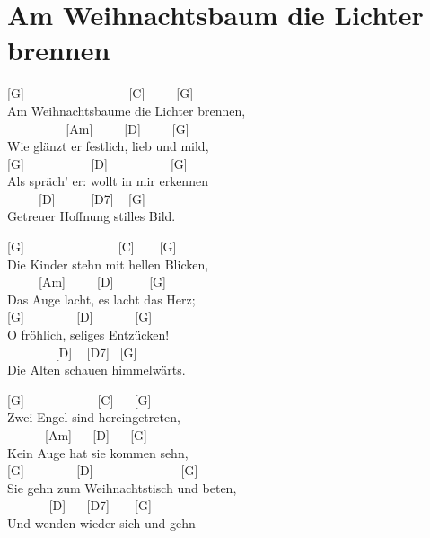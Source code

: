 \documentclass[
  letterpaper,
]{scrbook}
\begin{document}
\hypertarget{am-weihnachtsbaum-die-lichter-brennen}{%
\chapter{Am Weihnachtsbaum die Lichter
brennen}\label{am-weihnachtsbaum-die-lichter-brennen}}

{[}G{]} ~ ~ ~ ~ ~ ~ ~ ~ ~ ~{[}C{]} ~ ~ ~{[}G{]}\\
Am Weihnachtsbaume die Lichter brennen,\\
\hspace*{0.333em} ~ ~ ~ ~ ~ ~{[}Am{]} ~ ~ ~{[}D{]} ~ ~ ~{[}G{]}\\
Wie glänzt er festlich, lieb und mild,\\
{[}G{]} ~ ~ ~ ~ ~ ~ {[}D{]} ~ ~ ~ ~ ~ ~{[}G{]}\\
Als spräch' er: wollt in mir erkennen\\
\hspace*{0.333em} ~ ~ ~ {[}D{]} ~ ~ ~ {[}D7{]} ~ {[}G{]}\\
Getreuer Hoffnung stilles Bild.

{[}G{]} ~ ~ ~ ~ ~ ~ ~ ~ ~{[}C{]} ~ ~ {[}G{]}\\
Die Kinder stehn mit hellen Blicken,\\
\hspace*{0.333em} ~ ~ ~ {[}Am{]} ~ ~ ~{[}D{]} ~ ~ ~ {[}G{]}\\
Das Auge lacht, es lacht das Herz;\\
{[}G{]} ~ ~ ~ ~ ~{[}D{]} ~ ~ ~ ~{[}G{]}\\
O fröhlich, seliges Entzücken!\\
\hspace*{0.333em} ~ ~ ~ ~ ~{[}D{]} ~ {[}D7{]} ~{[}G{]}\\
Die Alten schauen himmelwärts.

{[}G{]} ~ ~ ~ ~ ~ ~ ~{[}C{]} ~ ~{[}G{]}\\
Zwei Engel sind hereingetreten,\\
\hspace*{0.333em} ~ ~ ~ ~{[}Am{]} ~ ~{[}D{]} ~ ~{[}G{]}\\
Kein Auge hat sie kommen sehn,\\
{[}G{]} ~ ~ ~ ~ ~{[}D{]} ~ ~ ~ ~ ~ ~ ~ ~ {[}G{]}\\
Sie gehn zum Weihnachtstisch und beten,\\
\hspace*{0.333em} ~ ~ ~ ~ {[}D{]} ~ ~{[}D7{]} ~ ~ {[}G{]}\\
Und wenden wieder sich und gehn
\end{document}
